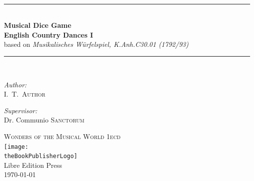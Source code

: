 \documentclass[letterpaper,x11names,svgnames,10pt]{article}
\title{\textsc{\mdgBookTitle}}
\author{\textsc{\authorFirstMidNameInit \authorLastName}}
\date{\textsc{\dateGenerated}}
\def\authorFirstMidNameInit{I.\ T.\ }
\def\authorLastName{Author}
\def\dateGenerated{\today}
\def\volNumber{I}
\def\mdgBookTitle{Musical Dice Game \\ \vspace{1.5mm} English Country Dances \volNumber}
\def\mdgBookSubTitle{Musikalisches W\"{u}rfelspiel, K.Anh.C30.01 (1792/93)}
\def\theBookSeries{Wonders of the Musical World 1ecd}
\def\theBookPublisher{Libre Edition Press}
\def\theBookPublisherLogo{../images/1ed.png}
\newcommand{\HRule}{\rule{\linewidth}{0.5mm}}
\begin{document}


\newpage

${}_{}$\\
\vspace{1.00in}	
\thispagestyle{empty}
\begin{center}
	\HRule \\[0.4cm]
	{\huge \bfseries \mdgBookTitle} \\[0.25cm]
	{\large based on {\em \mdgBookSubTitle} }\\[0.25cm]
	\HRule \\[1.5cm]
	\begin{minipage}{0.4\textwidth}
		\begin{flushleft} \large
			\emph{Author:}\\
			\authorFirstMidNameInit \textsc{\authorLastName}
		\end{flushleft}
	\end{minipage}
	\begin{minipage}{0.4\textwidth}
		\begin{flushright} \large
			\emph{Supervisor:} \\
			Dr. Communio \textsc{Sanctorum}
		\end{flushright}
	\end{minipage}
	\vfill
	{\textsc{\Large \theBookSeries}}  \\[0.2cm] 
	\texttt{[image: \\theBookPublisherLogo]}\\ 
	{\large \theBookPublisher \\
       \dateGenerated }\\
	\vspace{2.50in}
\end{center}
\newpage


\tableofcontents\label{tabofcon}


\newpage
\end{document}
